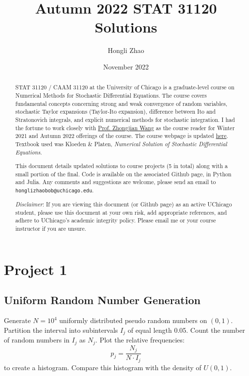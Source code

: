 \documentclass{article}
\title{Autumn 2022 STAT 31120 Solutions}
\author{Hongli Zhao}
\date{November 2022}
\begin{document}
\maketitle
\begin{abstract}
    STAT 31120 / CAAM 31120 at the University of Chicago is a graduate-level course on Numerical Methods for Stochastic Differential Equations. The course covers fundamental concepts concerning strong and weak convergence of random variables, stochastic Taylor expansions (Taylor-Ito expansion), difference between Ito and Stratonovich integrals, and explicit numerical methods for stochastic integration. I had the fortune to work closely with \href{https://www.stat.uchicago.edu/~zhongjian/}{Prof. Zhongjian Wang} as the course reader for Winter 2021 and Autumn 2022 offerings of the course. The course webpage is updated \href{https://www.stat.uchicago.edu/~zhongjian/courses/stat31120_2022aut/CourseHomepage.html}{here}. Textbook used was Kloeden \& Platen, \emph{Numerical Solution of Stochastic Differential Equations.}
    
    This document details updated solutions to course projects (5 in total) along with a small portion of the final. Code is available on the associated Github page, in Python and Julia. Any comments and suggestions are welcome, please send an email to \texttt{honglizhaobob@uchicago.edu}.

    \emph{Disclaimer}: If you are viewing this document (or Github page) as an active UChicago student, please use this document at your own risk, add appropriate references, and adhere to UChicago's academic integrity policy. Please email me or your course instructor if you are unsure.
\end{abstract}

\section{Project 1}
\subsection{Uniform Random Number Generation} 

\noindent \indent Generate $N = 10^4$ uniformly distributed pseudo random numbers on $(0,1)$. Partition the interval into subintervals $I_j$ of equal length 0.05. Count the number of random numbers in $I_j$ as $N_j$. Plot the relative frequencies:
$$
    p_j = \frac{N_j}{N\cdot I_j}
$$ to create a histogram. Compare this histogram with the density of $U(0,1)$. 
\end{document}
